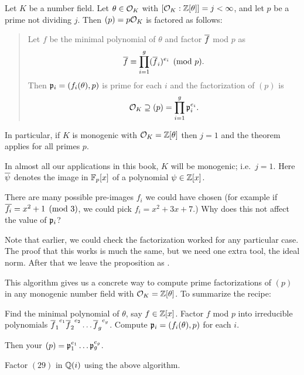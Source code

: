 \begin{theorem}
	\label{thm:factor_alg}
	Let $K$ be a number field.
	Let $\theta \in \mathcal O_K$ with $[\mathcal O_K : \mathbb Z[\theta]] = j < \infty$,
	and let $p$ be a prime not dividing $j$.
	Then $(p) = p \mathcal O_K$ is factored as follows:
	\begin{quote}
		Let $f$ be the minimal polynomial of $\theta$ and
		factor $\overline f$ mod $p$ as
		\[ \overline f \equiv \prod_{i=1}^g (\overline f_i)^{e_i} \pmod p. \]
		Then $\mathfrak p_i = (f_i(\theta), p)$ is prime for each $i$
		and the factorization of $(p)$ is
		\[ \mathcal O_K \supseteq (p) = \prod_{i=1}^g \mathfrak p_i^{e_i}. \]
	\end{quote}
	In particular, if $K$ is monogenic with $\mathcal O_K = \mathbb Z[\theta]$ then $j=1$
	and the theorem applies for all primes $p$.
\end{theorem}
In almost all our applications in this book, $K$ will be monogenic; i.e.\ $j=1$.
Here $\overline \psi$ denotes the image in $\mathbb F_p[x]$ of a polynomial $\psi \in \mathbb Z[x]$.

\begin{ques}
	There are many possible pre-images $f_i$ we could have chosen
	(for example if $\overline{f_i} = x^2+1 \pmod 3$, we could pick $f_i = x^2 + 3x + 7$.)
	Why does this not affect the value of $\mathfrak p_i$?
\end{ques}

Note that earlier, we could check the factorization worked
for any particular case. 
The proof that this works is much the same, but we need one extra tool, the ideal norm.
After that we leave the proposition as .

This algorithm gives us a concrete way to compute prime factorizations of $(p)$
in any monogenic number field with $\mathcal O_K = \mathbb Z[\theta]$. To summarize the recipe:
\begin{enumerate}
	\ii Find the minimal polynomial of $\theta$, say $f \in \mathbb Z[x]$.
	\ii Factor $f$ mod $p$ into irreducible polynomials
	${\overline f_1}^{e_1} {\overline f_2}^{e_2} \dots {\overline f_g}^{e_g}$.
	\ii Compute $\mathfrak p_i = (f_i(\theta), p)$ for each $i$.
\end{enumerate}
Then your $(p) = \mathfrak p_1^{e_1} \dots \mathfrak p_g^{e_g}$.

\begin{exercise}
	Factor $(29)$ in $\mathbb Q(i)$ using the above algorithm.
\end{exercise}


